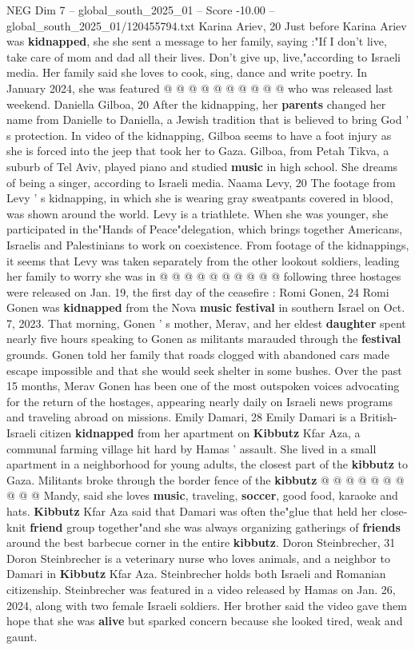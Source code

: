 \begin{textsample}{NEG Dim 7 – global\_south\_2025\_01 – Score -10.00 – global\_south\_2025\_01/120455794.txt}
Karina Ariev, 20 Just before Karina Ariev was \textbf{kidnapped}, she she sent a message to her family, saying :"If I don't live, take care of mom and dad all their lives.
Don't give up, live,"according to Israeli media.
Her family said she loves to cook, sing, dance and write poetry.
In January 2024, she was featured @ @ @ @ @ @ @ @ @ @ who was released last weekend.
Daniella Gilboa, 20 After the kidnapping, her \textbf{parents} changed her name from Danielle to Daniella, a Jewish tradition that is believed to bring God ' s protection.
In video of the kidnapping, Gilboa seems to have a foot injury as she is forced into the jeep that took her to Gaza.
Gilboa, from Petah Tikva, a suburb of Tel Aviv, played piano and studied \textbf{music} in high school.
She dreams of being a singer, according to Israeli media.
Naama Levy, 20 The footage from Levy ' s kidnapping, in which she is wearing gray sweatpants covered in blood, was shown around the world.
Levy is a triathlete.
When she was younger, she participated in the"Hands of Peace"delegation, which brings together Americans, Israelis and Palestinians to work on coexistence.
From footage of the kidnappings, it seems that Levy was taken separately from the other lookout soldiers, leading her family to worry she was in @ @ @ @ @ @ @ @ @ @ following three hostages were released on Jan. 19, the first day of the ceasefire : Romi Gonen, 24 Romi Gonen was \textbf{kidnapped} from the Nova \textbf{music} \textbf{festival} in southern Israel on Oct. 7, 2023.
That morning, Gonen ' s mother, Merav, and her eldest \textbf{daughter} spent nearly five hours speaking to Gonen as militants marauded through the \textbf{festival} grounds.
Gonen told her family that roads clogged with abandoned cars made escape impossible and that she would seek shelter in some bushes.
Over the past 15 months, Merav Gonen has been one of the most outspoken voices advocating for the return of the hostages, appearing nearly daily on Israeli news programs and traveling abroad on missions.
Emily Damari, 28 Emily Damari is a British-Israeli citizen \textbf{kidnapped} from her apartment on \textbf{Kibbutz} Kfar Aza, a communal farming village hit hard by Hamas ' assault.
She lived in a small apartment in a neighborhood for young adults, the closest part of the \textbf{kibbutz} to Gaza.
Militants broke through the border fence of the \textbf{kibbutz} @ @ @ @ @ @ @ @ @ @ Mandy, said she loves \textbf{music}, traveling, \textbf{soccer}, good food, karaoke and hats. \textbf{Kibbutz} Kfar Aza said that Damari was often the"glue that held her close-knit \textbf{friend} group together"and she was always organizing gatherings of \textbf{friends} around the best barbecue corner in the entire \textbf{kibbutz}.
Doron Steinbrecher, 31 Doron Steinbrecher is a veterinary nurse who loves animals, and a neighbor to Damari in \textbf{Kibbutz} Kfar Aza.
Steinbrecher holds both Israeli and Romanian citizenship.
Steinbrecher was featured in a video released by Hamas on Jan. 26, 2024, along with two female Israeli soldiers.
Her brother said the video gave them hope that she was \textbf{alive} but sparked concern because she looked tired, weak and gaunt.


\end{textsample}
